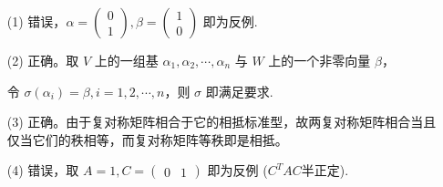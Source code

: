 \documentclass{ctexbook}
\begin{document}
\begin{enumerate}
\begin{enumerate}
        \item[(1)] 错误，\(\alpha=\begin{pmatrix} 0 \\ 1 \end{pmatrix},\beta=\begin{pmatrix} 1 \\ 0 \end{pmatrix}\) 即为反例.
        \item[(2)] 正确。取 \(V\) 上的一组基 \(\alpha_1,\alpha_2,\cdots,\alpha_n\) 与 \(W\) 上的一个非零向量 \(\beta\)，\par
        令 \(\sigma(\alpha_i)=\beta,i=1,2,\cdots,n\)，则 \(\sigma\) 即满足要求.
        \item[(3)] 正确。由于复对称矩阵相合于它的相抵标准型，故两复对称矩阵相合当且仅当它们的秩相等，而复对称矩阵等秩即是相抵。
        \item[(4)] 错误，取 \(A=1,C=\begin{pmatrix} 0 & 1 \end{pmatrix}\) 即为反例 (\(C^{T}AC\)半正定).
    \end{enumerate}
\end{enumerate}    
\end{document}
